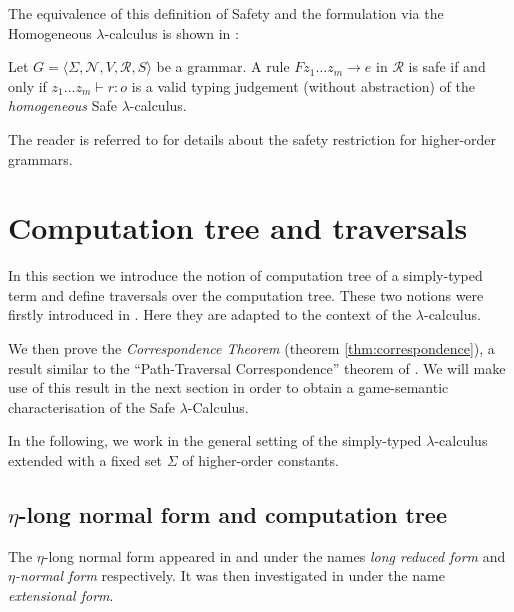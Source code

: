 \documentclass{llncs}
\begin{document}
The equivalence of this definition of Safety and the formulation via the Homogeneous $\lambda$-calculus is shown in \cite{demirandathesis}:
\begin{proposition} Let $G = \langle \Sigma, \mathcal{N}, V, \mathcal{R}, S \rangle$ be a grammar.
A rule $F z_1 \ldots z_m \rightarrow e$ in $\mathcal{R}$ is safe if and only if
$ z_1 \ldots z_m \vdash r : o$
is a valid typing judgement (without abstraction) of the \emph{homogeneous} Safe $\lambda$-calculus.
\end{proposition}


The reader is referred to \cite{KNU02,demirandathesis,safety-mirlong2004}
for details about the safety restriction for higher-order grammars.









\section{Computation tree and traversals}
\label{sec:correspondence}

In this section we introduce the notion of computation tree of a simply-typed term and
define traversals over the computation tree. These two notions were firstly introduced in \cite{OngLics2006}. Here they
are adapted to the context of the $\lambda$-calculus.

We then prove the \emph{Correspondence Theorem} (theorem \ref{thm:correspondence}), a result similar to the ``Path-Traversal Correspondence'' theorem of \cite{OngLics2006}. We will make use of this result in the next section in order to obtain
a game-semantic characterisation of the Safe $\lambda$-Calculus.

In the following, we work in the general setting of the simply-typed
$\lambda$-calculus extended with a fixed set $\Sigma$ of
higher-order constants.


\subsection{$\eta$-long normal form and computation tree}


The $\eta$-long normal form appeared in
\cite{DBLP:journals/tcs/JensenP76} and
\cite{DBLP:journals/tcs/Huet75} under the names \emph{long reduced
form} and \emph{$\eta$-normal form} respectively. It was then
investigated in \cite{huet76} under the name \emph{extensional
form}.
\end{document}
